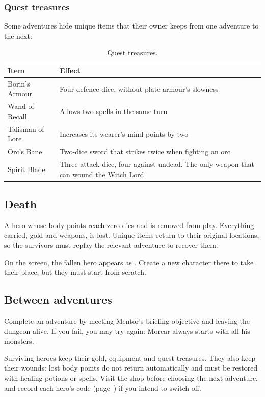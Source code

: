 \subsubsection*{Quest treasures}
Some adventures hide unique items that their owner keeps from one adventure to the next:
\begin{table}[H]\centering\small
\begin{tabularx}{\linewidth}{@{}lL@{}}
\toprule\textbf{Item} & \textbf{Effect}\\\midrule
Borin's Armour & Four defence dice, without plate armour's slowness\\
Wand of Recall & Allows two spells in the same turn\\
Talisman of Lore & Increases its wearer's mind points by two\\
Orc's Bane & Two-dice sword that strikes twice when fighting an orc\\
Spirit Blade & Three attack dice, four against undead. The only weapon that can wound the Witch Lord\\\bottomrule
\end{tabularx}\caption{Quest treasures.}\end{table}
\subsection{Death}
A hero whose body points reach zero dies and is removed from play. Everything carried, gold and weapons, is lost. Unique items return to their original locations, so the survivors must replay the relevant adventure to recover them.

On the  screen, the fallen hero appears as . Create a new character there to take their place, but they must start from scratch.
\subsection{Between adventures}
Complete an adventure by meeting Mentor's briefing objective and leaving the dungeon alive. If you fail, you may try again: Morcar always starts with all his monsters.

Surviving heroes keep their gold, equipment and quest treasures. They also keep their wounds: lost body points do not return automatically and must be restored with healing potions or spells. Visit the shop before choosing the next adventure, and record each hero's code (page~\pageref{sec:codigos}) if you intend to switch off.
